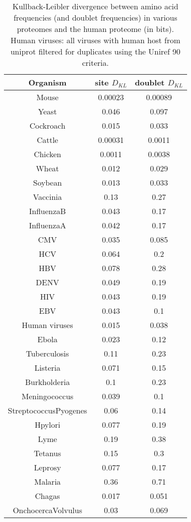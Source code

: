 \documentclass[superscriptaddress,twocolumn,pre]{revtex4}
\newcommand{\<}{\langle}
\renewcommand{\>}{\rangle}
\begin{document}
\begin{table}
    \begin{center}
        \begin{tabular}{ c c c }
            Organism&site $D_{KL}$&doublet $D_{KL}$\\
            \hline
Mouse&0.00023&0.00089\\
Yeast&0.046&0.097\\
Cockroach&0.015&0.033\\
Cattle&0.00031&0.0011\\
Chicken&0.0011&0.0038\\
Wheat&0.012&0.029\\
Soybean&0.013&0.033\\\hline
Vaccinia&0.13&0.27\\
InfluenzaB&0.043&0.17\\
InfluenzaA&0.042&0.17\\
CMV&0.035&0.085\\
HCV&0.064&0.2\\
HBV&0.078&0.28\\
DENV&0.049&0.19\\
HIV&0.043&0.19\\
EBV&0.043&0.1\\ \hline
Human viruses&0.015&0.038\\\hline
Ebola&0.023&0.12\\
Tuberculosis&0.11&0.23\\
Listeria&0.071&0.15\\
Burkholderia&0.1&0.23\\
Meningococcus&0.039&0.1\\
StreptococcusPyogenes&0.06&0.14\\
Hpylori&0.077&0.19\\
Lyme&0.19&0.38\\
Tetanus&0.15&0.3\\ 
Leprosy&0.077&0.17\\ \hline
Malaria&0.36&0.71\\
Chagas&0.017&0.051\\
OnchocercaVolvulus&0.03&0.069\\
        \end{tabular}
    \end{center}
    \caption{Kullback-Leibler divergence between amino acid frequencies (and doublet frequencies) in various proteomes and the human proteome (in bits). Human viruses: all viruses with human host from uniprot filtered for duplicates using the Uniref 90 criteria.}
    \label{tabkldiv}
\end{table}
\end{document}
